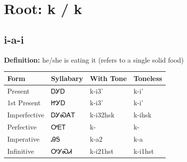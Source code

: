 \documentclass{article}%
\begin{document}
%
\normalsize%
\section*{Root: k / k}%
\subsection*{i-a-i}%
\textbf{Definition: }%
he/she is eating it (refers to a single solid food)%
\\[0.5em]%
\begin{tabular}{|l|l|l|l|}%
\hline%
\textbf{Form}&\textbf{Syllabary}&\textbf{With Tone}&\textbf{Toneless}\\%
\hline%
Present&ᎠᎩᎠ&k{-}i3'&k{-}i'\\%
1st Present&ᏥᎩᎠ&k{-}i3'&k{-}i'\\%
Imperfective&ᎠᎩᏍᎪᎢ&k{-}i32hsk&k{-}ihsk\\%
Perfective&ᎤᎬᎢ&k{-}&k{-}\\%
Imperative&ᎯᎦ&k{-}a2&k{-}a\\%
Infinitive&ᎤᎩᏍᏗ&k{-}i21hst&k{-}i1hst\\%
\hline%
\end{tabular}%
\\[1em]%
\end{document}
